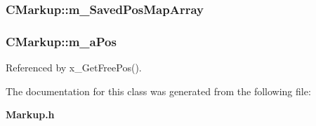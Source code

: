 \subsubsection[m\_\-SavedPosMapArray]{ {\bf CMarkup::m\_\-SavedPosMapArray}\hspace{0.3cm}{\tt  [protected]}}\label{classCMarkup_985f2d24ba021221c567b4bfadf91692}


\subsubsection[m\_\-aPos]{ {\bf CMarkup::m\_\-aPos}\hspace{0.3cm}{\tt  [protected]}}\label{classCMarkup_89aa5e4c38062a7e826a67695a8d8f37}




Referenced by x\_\-GetFreePos().

The documentation for this class was generated from the following file:\begin{CompactItemize}
\item 
{\bf Markup.h}\end{CompactItemize}
